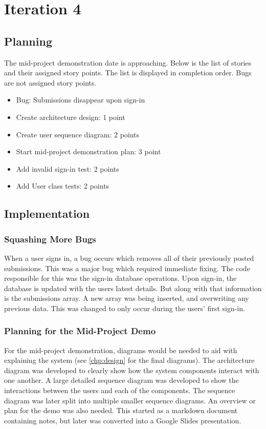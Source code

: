 \chapter{Iteration 4}
\section{Planning}
The mid-project demonstration date is approaching. Below is the list of stories and their assigned story points. The list is displayed in completion order. Bugs are not assigned story points.

\begin{itemize}
\item Bug: Submissions disappear upon sign-in
\item Create architecture design: 1 point
\item Create user sequence diagram: 2 points
\item Start mid-project demonstration plan: 3 point
\item Add invalid sign-in test: 2 points
\item Add User class tests: 2 points
\end{itemize}

\section{Implementation}
\subsection{Squashing More Bugs}
When a user signs in, a bug occurs which removes all of their previously posted submissions. This was a major bug which required immediate fixing. The code responsible for this was the sign-in database operations. Upon sign-in, the database is updated with the users latest details. But along with that information is the submissions array. A new array was being inserted, and overwriting any previous data. This was changed to only occur during the users' first sign-in.

\subsection{Planning for the Mid-Project Demo}
For the mid-project demonstration, diagrams would be needed to aid with explaining the system (see \autoref{chp:design} for the final diagrams). The architecture diagram was developed to clearly show how the system components interact with one another. A large detailed sequence diagram was developed to show the interactions between the users and each of the components. The sequence diagram was later split into multiple smaller sequence diagrams. An overview or plan for the demo was also needed. This started as a markdown document containing notes, but later was converted into a Google Slides presentation.

